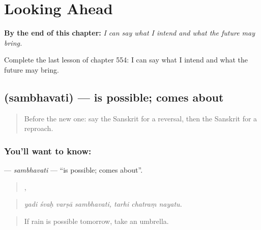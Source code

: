 
\chapter{Looking Ahead}
\label{ch:sa-looking-ahead}

\begin{chapteropening}
\textbf{By the end of this chapter:} \emph{I can say what I intend and what the future may bring.}

Complete the last lesson of chapter 554: I can say what I intend and what the future may bring.
\end{chapteropening}

\section[\texorpdfstring{\sk{सम्भवति} (sambhavati)}{सम्भवति (sambhavati)}]{ (sambhavati) — is possible; comes about}

\label{lesson:SA-C554-sambhavati}



\begin{quote}
Before the new one: say the Sanskrit for a reversal, then the Sanskrit for a reproach.
\end{quote}

\subsection*{You'll want to know: }
\textbf{} — \emph{sambhavati} — \textquotedblleft{}is possible; comes about\textquotedblright{}.

\begin{quote}
   ,   
\end{quote}

\begin{quote}
\emph{yadi śvaḥ varṣā sambhavati, tarhi chatraṃ nayatu.}
\end{quote}

\begin{quote}
If rain is possible tomorrow, take an umbrella.
\end{quote}

